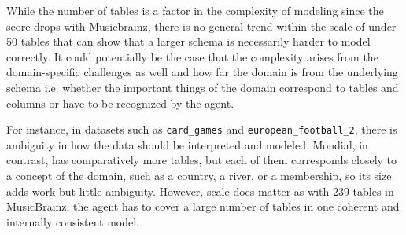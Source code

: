 While the number of tables is a factor in the complexity of modeling since the score drops with Musicbrainz, there is no general trend within the scale of under 50 tables that can show that a larger schema is necessarily harder to model correctly. It could potentially be the case that the complexity arises from the domain-specific challenges as well and how far the domain is from the underlying schema i.e. whether the important things of the domain correspond to tables and columns or have to be recognized by the agent. 

For instance, in datasets such as \texttt{card\_games} and \texttt{european\_football\_2}, there is ambiguity in how the data should be interpreted and modeled. Mondial, in contrast, has comparatively more tables, but each of them corresponds closely to a concept of the domain, such as a country, a river, or a membership, so its size adds work but little ambiguity. However, scale does matter as with 239 tables in MusicBrainz, the agent has to cover a large number of tables in one coherent and internally consistent model.




